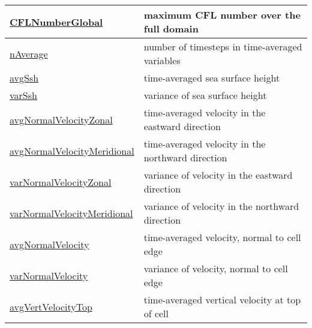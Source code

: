 {\begin{center}
\begin{longtable}{| p{2.0in} | p{4.0in} |}
	\hline
	\hyperref[subsec:var_sec_state_CFLNumberGlobal]{CFLNumberGlobal} & maximum CFL number over the full domain \\
	\hline
	\hyperref[subsec:var_sec_state_nAverage]{nAverage} & number of timesteps in time-averaged variables \\
	\hline
	\hyperref[subsec:var_sec_state_avgSsh]{avgSsh} & time-averaged sea surface height \\
	\hline
	\hyperref[subsec:var_sec_state_varSsh]{varSsh} & variance of sea surface height \\
	\hline
	\hyperref[subsec:var_sec_state_avgNormalVelocityZonal]{avgNormalVelocityZonal} & time-averaged velocity in the eastward direction \\
	\hline
	\hyperref[subsec:var_sec_state_avgNormalVelocityMeridional]{avgNormalVelocityMeridional} & time-averaged velocity in the northward direction \\
	\hline
	\hyperref[subsec:var_sec_state_varNormalVelocityZonal]{varNormalVelocityZonal} & variance of velocity in the eastward direction \\
	\hline
	\hyperref[subsec:var_sec_state_varNormalVelocityMeridional]{varNormalVelocityMeridional} & variance of velocity in the northward direction \\
	\hline
	\hyperref[subsec:var_sec_state_avgNormalVelocity]{avgNormalVelocity} & time-averaged velocity, normal to cell edge \\
	\hline
	\hyperref[subsec:var_sec_state_varNormalVelocity]{varNormalVelocity} & variance of velocity, normal to cell edge \\
	\hline
	\hyperref[subsec:var_sec_state_avgVertVelocityTop]{avgVertVelocityTop} & time-averaged vertical velocity at top of cell \\
	\hline
\end{longtable}
\end{center}
}
